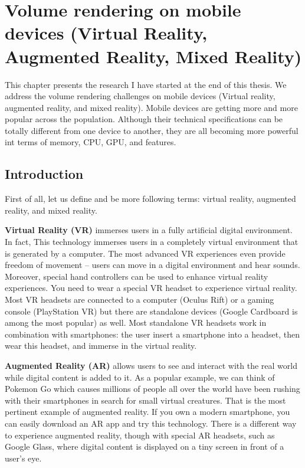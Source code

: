 \chapter{Volume rendering on mobile devices (Virtual Reality, Augmented Reality, Mixed Reality) }
\label{mixedReality}

This chapter presents the research I have started at the end of this thesis. 
We address the volume rendering challenges on mobile devices (Virtual reality, augmented reality, and mixed reality). Mobile devices are getting more and more popular across the population. Although their technical specifications can be totally different from one device to another, they are all becoming more powerful int terms of memory, CPU, GPU, and features.

\section{Introduction}

First of all, let us define and be more following terms: virtual reality, augmented reality, and mixed reality.

\par \textbf{ Virtual Reality (VR)} immerses users in a fully artificial digital environment. In fact, This technology immerses users in a completely virtual environment that is generated by a computer. The most advanced VR experiences even provide freedom of movement – users can move in a digital environment and hear sounds. Moreover, special hand controllers can be used to enhance  virtual reality experiences.\newline
You need to wear a special VR headset to experience virtual reality. Most VR headsets are connected to a computer (Oculus Rift) or a gaming console (PlayStation VR) but there are standalone devices (Google Cardboard is among the most popular) as well. Most standalone VR headsets work in combination with smartphones: the user insert a smartphone into a headset, then wear this headset, and immerse in the virtual reality.

\par \textbf{Augmented Reality (AR)} allows users to see and interact with the real world while digital content is added to it. As a popular example, we can think of Pokemon Go which causes millions of people all over the world have been rushing with their smartphones in search for small virtual creatures. That is the most pertinent example of augmented reality. \newline
If you own a modern smartphone, you can easily download an AR app and try this technology. There is a different way to experience augmented reality, though  with special AR headsets, such as Google Glass, where digital content is displayed on a tiny screen in front of a user's eye.

